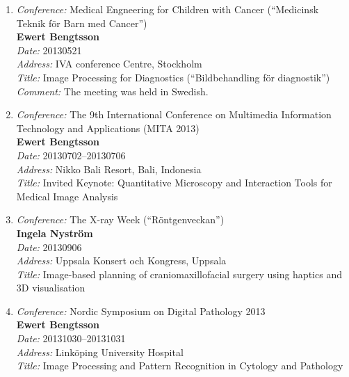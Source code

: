 \begin{enumerate}
\item 
{\em Conference:} Medical Engneering for Children with Cancer (``Medicinsk Teknik f\"{o}r Barn med Cancer'')~\\
{\bf Ewert Bengtsson}~\\
{\em Date:} 20130521~\\
{\em Address:} IVA conference Centre, Stockholm~\\
{\em Title:} Image Processing for Diagnostics (``Bildbehandling f\"{o}r diagnostik'')~\\
{\em Comment:} The meeting was held in Swedish.

\item 
{\em Conference:} The 9th International Conference on Multimedia Information Technology and Applications (MITA 2013)~\\
{\bf Ewert Bengtsson}~\\
{\em Date:} 20130702--20130706~\\
{\em Address:} Nikko Bali Resort, Bali, Indonesia~\\
{\em Title:} Invited Keynote: Quantitative Microscopy and Interaction Tools for Medical Image Analysis

\item 
{\em Conference:} The X-ray Week (``R\"{o}ntgenveckan'')~\\
{\bf Ingela Nystr\"{o}m}~\\
{\em Date:} 20130906~\\
{\em Address:} Uppsala Konsert och Kongress, Uppsala~\\
{\em Title:} Image-based planning of craniomaxillofacial surgery using haptics and 3D visualisation%






\item 
{\em Conference:} Nordic Symposium on Digital Pathology 2013~\\
{\bf Ewert Bengtsson}~\\
{\em Date:} 20131030--20131031~\\
{\em Address:} Link\"{o}ping University Hospital~\\
{\em Title:} Image Processing and Pattern Recognition in Cytology and Pathology


\end{enumerate}
